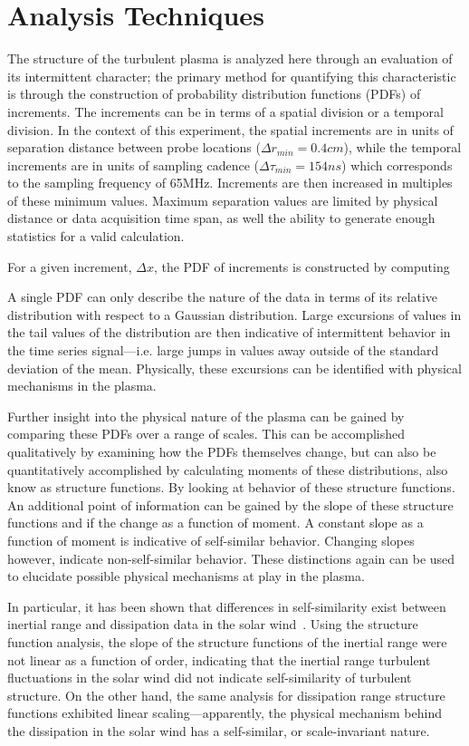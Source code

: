 \documentclass[aps,prl,amsmath,amssymb,reprint,superscriptaddress]{revtex4-1} %
\begin{document}
\section{Analysis Techniques}\label{sec:analysis}

The structure of the turbulent plasma is analyzed here through an evaluation of its intermittent character; the primary method for quantifying this characteristic is through the construction of probability distribution functions (PDFs) of increments. The increments can be in terms of a spatial division or a temporal division. In the context of this experiment, the spatial increments are in units of separation distance between probe locations ($\Delta r_{min} = 0.4cm$), while the temporal increments are in units of sampling cadence ($\Delta \tau_{min} = 154ns$) which corresponds to the sampling frequency of 65MHz. Increments are then increased in multiples of these minimum values. Maximum separation values are limited by physical distance or data acquisition time span, as well the ability to generate enough statistics for a valid calculation.

For a given increment, $\Delta x$, the PDF of increments is constructed by computing 

A single PDF can only describe the nature of the data in terms of its relative distribution with respect to a Gaussian distribution. Large excursions of values in the tail values of the distribution are then indicative of intermittent behavior in the time series signal---i.e. large jumps in values away outside of the standard deviation of the mean. Physically, these excursions can be identified with physical mechanisms in the plasma.

Further insight into the physical nature of the plasma can be gained by comparing these PDFs over a range of scales. This can be accomplished qualitatively by examining how the PDFs themselves change, but can also be quantitatively accomplished by calculating moments of these distributions, also know as structure functions. By looking at behavior of these structure functions. An additional point of information can be gained by the slope of these structure functions and if the change as a function of moment. A constant slope as a function of moment is indicative of self-similar behavior. Changing slopes however, indicate non-self-similar behavior. These distinctions again can be used to elucidate possible physical mechanisms at play in the plasma. 

In particular, it has been shown that differences in self-similarity exist between inertial range and dissipation data in the solar wind~\cite{kiyani2013}. Using the structure function analysis, the slope of the structure functions of the inertial range were not linear as a function of order, indicating that the inertial range turbulent fluctuations in the solar wind did not indicate self-similarity of turbulent structure. On the other hand, the same analysis for dissipation range structure functions exhibited linear scaling---apparently, the physical mechanism behind the dissipation in the solar wind has a self-similar, or scale-invariant nature.
\end{document}
